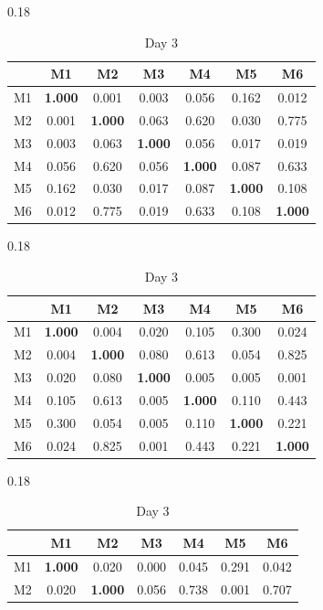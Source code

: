 \begin{table}[htbp]
\centering
\caption{Within-day MAC matrices between the three tracked modes.}
\label{tab:mac_within}
\begin{subtable}[t]{0.18\linewidth}
\centering
\caption*{Day 1}
\begin{tabular}{ccccccc}
\toprule
& M1 & M2 & M3 & M4 & M5 & M6 \\
\midrule
M1 & \textbf{1.000} & 0.001 & 0.003 & 0.056 & 0.162 & 0.012 \\
M2 & 0.001 & \textbf{1.000} & 0.063 & 0.620 & 0.030 & 0.775 \\
M3 & 0.003 & 0.063 & \textbf{1.000} & 0.056 & 0.017 & 0.019 \\
M4 & 0.056 & 0.620 & 0.056 & \textbf{1.000} & 0.087 & 0.633 \\
M5 & 0.162 & 0.030 & 0.017 & 0.087 & \textbf{1.000} & 0.108 \\
M6 & 0.012 & 0.775 & 0.019 & 0.633 & 0.108 & \textbf{1.000} \\
\bottomrule
\end{tabular}
\end{subtable}
\hfill
\begin{subtable}[t]{0.18\linewidth}
\centering
\caption*{Day 2}
\begin{tabular}{ccccccc}
\toprule
& M1 & M2 & M3 & M4 & M5 & M6 \\
\midrule
M1 & \textbf{1.000} & 0.004 & 0.020 & 0.105 & 0.300 & 0.024 \\
M2 & 0.004 & \textbf{1.000} & 0.080 & 0.613 & 0.054 & 0.825 \\
M3 & 0.020 & 0.080 & \textbf{1.000} & 0.005 & 0.005 & 0.001 \\
M4 & 0.105 & 0.613 & 0.005 & \textbf{1.000} & 0.110 & 0.443 \\
M5 & 0.300 & 0.054 & 0.005 & 0.110 & \textbf{1.000} & 0.221 \\
M6 & 0.024 & 0.825 & 0.001 & 0.443 & 0.221 & \textbf{1.000} \\
\bottomrule
\end{tabular}
\end{subtable}
\hfill
\begin{subtable}[t]{0.18\linewidth}
\centering
\caption*{Day 3}
\begin{tabular}{ccccccc}
\toprule
& M1 & M2 & M3 & M4 & M5 & M6 \\
\midrule
M1 & \textbf{1.000} & 0.020 & 0.000 & 0.045 & 0.291 & 0.042 \\
M2 & 0.020 & \textbf{1.000} & 0.056 & 0.738 & 0.001 & 0.707 \\

\end{tabular}
\end{subtable}
\end{table}
